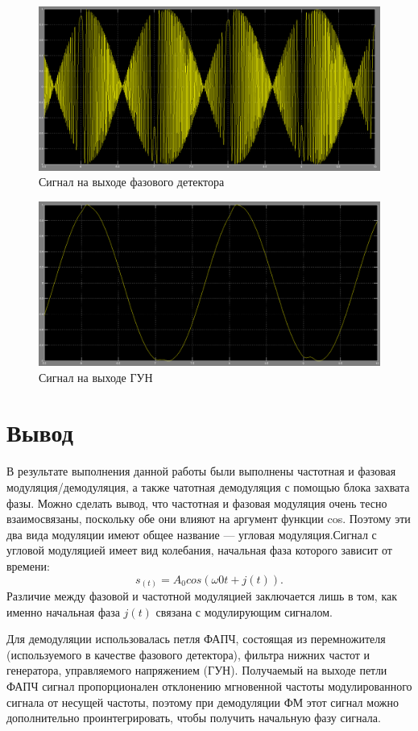 \begin{figure}[H]

\includegraphics[width=150mm, scale = 0.9]{lab8/8_16}
   \caption{Сигнал на выходе фазового детектора}

\end{figure}
\begin{figure}[H]

\includegraphics[width=150mm, scale = 0.9]{lab8/8_17}
   \caption{Сигнал на выходе ГУН}

\end{figure}
\section{Вывод}

В результате выполнения данной работы были выполнены частотная и фазовая модуляция/демодуляция, а также чатотная демодуляция с  помощью блока захвата фазы. Можно сделать вывод, что частотная и фазовая модуляция очень тесно взаимосвязаны, поскольку обе они влияют на аргумент функции cos. Поэтому эти два вида модуляции имеют общее название — угловая модуляция.Сигнал с угловой модуляцией имеет вид колебания, начальная фаза которого зависит от времени:
	\begin{equation}
	s_(t) = A_0 cos(\omega0 t + j(t)).
	\end{equation}
Различие между фазовой и частотной модуляцией заключается лишь в том, как именно начальная фаза $j(t)$ связана с модулирующим сигналом.

Для демодуляции использовалась петля ФАПЧ, состоящая из перемножителя (используемого в качестве фазового детектора), фильтра нижних частот и генератора, управляемого напряжением (ГУН). Получаемый на выходе петли ФАПЧ сигнал пропорционален отклонению мгновенной частоты модулированного сигнала от несущей частоты, поэтому при демодуляции ФМ этот сигнал можно дополнительно проинтегрировать, чтобы получить начальную фазу сигнала.